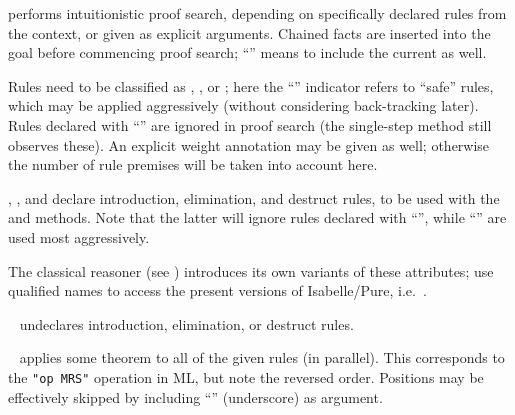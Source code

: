 \begin{isabellebody}
\begin{isamarkuptext}
\begin{descr}
  \item [\mbox{\isa{iprover}}] performs intuitionistic proof search,
  depending on specifically declared rules from the context, or given
  as explicit arguments.  Chained facts are inserted into the goal
  before commencing proof search; ``\mbox{}\isa{{\isachardoublequote}{\isacharbang}{\isachardoublequote}}'' 
  means to include the current \mbox{} as well.
  
  Rules need to be classified as \mbox{}, \mbox{}, or \mbox{}; here the ``\isa{{\isachardoublequote}{\isacharbang}{\isachardoublequote}}'' indicator
  refers to ``safe'' rules, which may be applied aggressively (without
  considering back-tracking later).  Rules declared with ``\isa{{\isachardoublequote}{\isacharquery}{\isachardoublequote}}'' are ignored in proof search (the single-step \mbox{}
  method still observes these).  An explicit weight annotation may be
  given as well; otherwise the number of rule premises will be taken
  into account here.
  
  \item [\mbox{\isa{intro}}, \mbox{\isa{elim}}, and \mbox{\isa{dest}}]
  declare introduction, elimination, and destruct rules, to be used
  with the \mbox{} and \mbox{} methods.  Note that
  the latter will ignore rules declared with ``\isa{{\isachardoublequote}{\isacharquery}{\isachardoublequote}}'', while
  ``\isa{{\isachardoublequote}{\isacharbang}{\isachardoublequote}}''  are used most aggressively.
  
  The classical reasoner (see ) introduces its
  own variants of these attributes; use qualified names to access the
  present versions of Isabelle/Pure, i.e.\ \mbox{}.
  
  \item [\mbox{\isa{rule}}~\isa{del}] undeclares introduction,
  elimination, or destruct rules.
  
  \item [\mbox{\isa{OF}}~\isa{{\isachardoublequote}a\isactrlsub {\isadigit{1}}\ {\isasymdots}\ a\isactrlsub n{\isachardoublequote}}] applies some
  theorem to all of the given rules 
  (in parallel).  This corresponds to the \verb|"op MRS"| operation in
  ML, but note the reversed order.  Positions may be effectively
  skipped by including ``\isa{{\isacharunderscore}}'' (underscore) as argument.
  

\end{descr}
\end{isamarkuptext}
\end{isabellebody}
